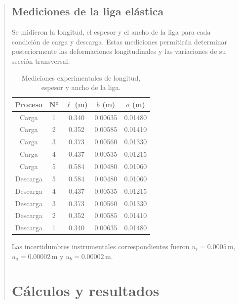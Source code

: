 \documentclass[11pt,a4paper]{article}
\begin{document}
\begin{quote}
\subsection{Mediciones de la liga elástica}

Se midieron la longitud, el espesor y el ancho de la liga
para cada condición de carga y descarga. Estas mediciones
permitirán determinar posteriormente las deformaciones
longitudinales y las variaciones de su sección transversal.

\begin{table}[H]
    \centering
    \small
    \renewcommand{\arraystretch}{1.12}
    \setlength{\tabcolsep}{5pt}
    \begin{tabular}{ccccc}
        \toprule
        \textbf{Proceso} &
        \textbf{N°} &
        \textbf{$\ell$ (m)} &
        \textbf{$b$ (m)} &
        \textbf{$a$ (m)} \\
        \midrule
        Carga    & 1 & 0.340 & 0.00635 & 0.01480 \\
        Carga    & 2 & 0.352 & 0.00585 & 0.01410 \\
        Carga    & 3 & 0.373 & 0.00560 & 0.01330 \\
        Carga    & 4 & 0.437 & 0.00535 & 0.01215 \\
        Carga    & 5 & 0.584 & 0.00480 & 0.01060 \\
        \midrule
        Descarga & 5 & 0.584 & 0.00480 & 0.01060 \\
        Descarga & 4 & 0.437 & 0.00535 & 0.01215 \\
        Descarga & 3 & 0.373 & 0.00560 & 0.01330 \\
        Descarga & 2 & 0.352 & 0.00585 & 0.01410 \\
        Descarga & 1 & 0.340 & 0.00635 & 0.01480 \\
        \bottomrule
    \end{tabular}
    \caption{Mediciones experimentales de longitud,
    espesor y ancho de la liga.}
    \label{tab:datos_liga}
\end{table}

\noindent
Las incertidumbres instrumentales correspondientes
fueron $u_{\ell}=0.0005\,\mathrm{m}$,
$u_a=0.00002\,\mathrm{m}$ y
$u_b=0.00002\,\mathrm{m}$.

\par
\endgroup

\newpage
\section{Cálculos y resultados}


\end{quote}
\end{document}
